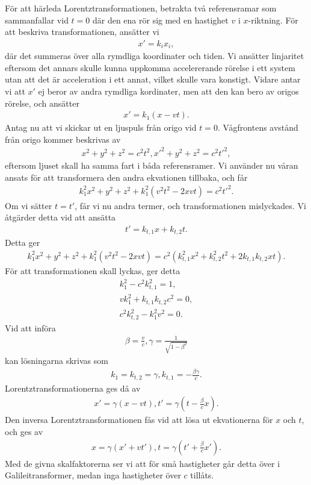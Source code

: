 För att härleda Lorentztransformationen, betrakta två referensramar som sammanfallar vid $t = 0$ där den ena rör sig med en hastighet $v$ i $x$-riktning. För att beskriva transformationen, ansätter vi
\begin{align*}
	x' = k_{i}x_{i},
\end{align*}
där det summeras över alla rymdliga koordinater och tiden. Vi ansätter linjaritet eftersom det annars skulle kunna uppkomma accelererande rörelse i ett system utan att det är acceleration i ett annat, vilket skulle vara konstigt. Vidare antar vi att $x'$ ej beror av andra rymdliga kordinater, men att den kan bero av origos rörelse, och ansätter
\begin{align*}
	x' = k_{1}(x - vt).
\end{align*}
Antag nu att vi skickar ut en ljuspuls från origo vid $t = 0$. Vågfrontens avstånd från origo kommer beskrivas av
\begin{align*}
	x^{2} + y^{2} + z^{2} = c^{2}t^{2},
	x'^{2} + y^{2} + z^{2} = c^{2}t'^{2},
\end{align*}
eftersom ljuset skall ha samma fart i båda referensramer. Vi använder nu våran ansats för att transformera den andra ekvationen tillbaka, och får
\begin{align*}
	k_{1}^{2}x^{2} + y^{2} + z^{2} + k_{1}^{2}(v^{2}t^{2} - 2xvt) = c^{2}t'^{2}.
\end{align*}
Om vi sätter $t = t'$, får vi nu andra termer, och transformationen mislyckades. Vi åtgärder detta vid att ansätta
\begin{align*}
	t' = k_{t, 1}x + k_{t, 2}t.
\end{align*}
Detta ger
\begin{align*}
	k_{1}^{2}x^{2} + y^{2} + z^{2} + k_{1}^{2}(v^{2}t^{2} - 2xvt) = c^{2}(k_{t, 1}^{2}x^{2} + k_{t, 2}^{2}t^{2} + 2k_{t, 1}k_{t, 2}xt).
\end{align*}
För att transformationen skall lyckas, ger detta
\begin{align*}
	k_{1}^{2} - c^{2}k_{t, 1}^{2} = 1, \\
	vk_{1}^{2} + k_{t, 1}k_{t, 2}c^{2} = 0, \\
	c^{2}k_{t, 2}^{2} - k_{1}^{2}v^{2} = 0.
\end{align*}
Vid att införa
\begin{align*}
	\beta = \frac{v}{c}, \gamma = \frac{1}{\sqrt{1 - \beta^{2}}}
\end{align*}
kan lösningarna skrivas som
\begin{align*}
	k_{1} = k_{t, 2} = \gamma, k_{t, 1} = -\frac{\beta\gamma}{c}.
\end{align*}
Lorentztransformationerna ges då av
\begin{align*}
	x' = \gamma(x - vt), t' = \gamma\left(t - \frac{\beta}{c}x\right).
\end{align*}
Den inversa Lorentztransformationen fås vid att lösa ut ekvationerna för $x$ och $t$, och ges av
\begin{align*}
	x = \gamma(x' + vt'), t = \gamma(t' + \frac{\beta}{c}x').
\end{align*}
Med de givna skalfaktorerna ser vi att för små hastigheter går detta över i Galileitransformer, medan inga hastigheter över $c$ tillåts.

